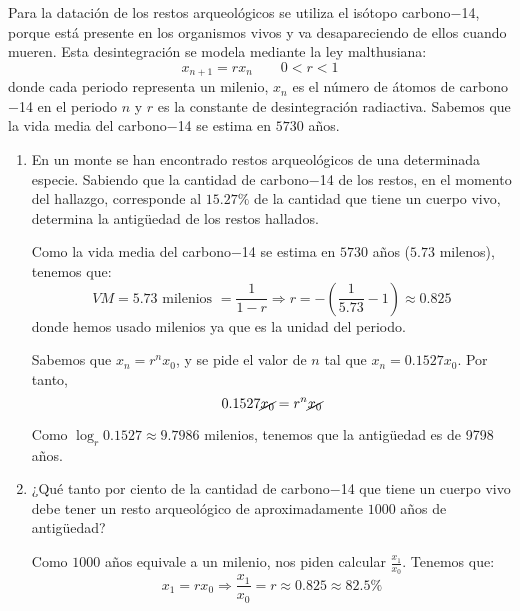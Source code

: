 \begin{ejercicio} 
Para la datación de los restos arqueológicos se utiliza el isótopo carbono$-$14, porque está presente en los organismos vivos y va desapareciendo de ellos cuando mueren. Esta desintegración se modela mediante la ley malthusiana: 
$$x_{n+1} = r x_n \qquad 0 < r < 1$$
donde cada periodo representa un milenio, \(x_n\) es el número de átomos de carbono$-$14 en el periodo \(n\) y \(r\) es la constante de desintegración radiactiva. Sabemos que la vida media del carbono$-$14 se estima en $5730$ años.
    \begin{enumerate}
        \item En un monte se han encontrado restos arqueológicos de una determinada especie. Sabiendo que la cantidad de carbono$-$14 de los restos, en el momento del hallazgo, corresponde al $15.27\%$ de la cantidad que tiene un cuerpo vivo, determina la antigüedad de los restos hallados.

        Como la vida media del carbono$-$14 se estima en $5730$ años ($5.73$ milenos), tenemos que:
        \begin{equation*}
            VM = 5.73 \text{ milenios } = \frac{1}{1-r} \Longrightarrow
            r = -\left(\frac{1}{5.73}-1\right) \approx 0.825 
        \end{equation*}
        donde hemos usado milenios ya que es la unidad del periodo.

        Sabemos que $x_n = r^n x_0$, y se pide el valor de $n$ tal que $x_n = 0.1527x_0$. Por tanto,
        \begin{equation*}
            0.1527 \cancel{x_0} = r^n \cancel{x_0}
        \end{equation*}

        Como $\log_{r}0.1527 \approx 9.7986$ milenios, tenemos que la antigüedad es de 9798 años.
        
        \item ¿Qué tanto por ciento de la cantidad de carbono$-$14 que tiene un cuerpo vivo debe tener un resto arqueológico de aproximadamente $1000$ años de antigüedad?

        Como $1000$ años equivale a un milenio, nos piden calcular $\frac{x_1}{x_0}$. Tenemos que:
        \begin{equation*}
            x_1 = rx_0 \Longrightarrow \frac{x_1}{x_0}=r\approx 0.825 \approx 82.5\%
        \end{equation*}
    \end{enumerate}
\end{ejercicio}

